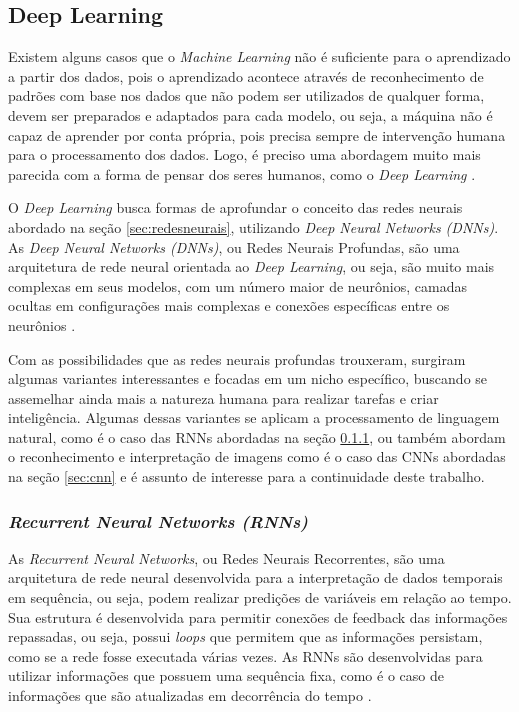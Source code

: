 \subsection{Deep Learning}
Existem alguns casos que o \emph{Machine Learning} não é suficiente para o aprendizado a partir dos dados, pois o aprendizado acontece através de reconhecimento de padrões com base nos dados que não podem ser utilizados de qualquer forma, devem ser preparados e adaptados para cada modelo, ou seja, a máquina não é capaz de aprender por conta própria, pois precisa sempre de intervenção humana para o processamento dos dados. Logo, é preciso uma abordagem muito mais parecida com a forma de pensar dos seres humanos, como o \emph{Deep Learning} \cite{deepLearningPython, deepLearningTensorFlow}.

O \emph{Deep Learning} busca formas de aprofundar o conceito das redes neurais abordado na seção \ref{sec:redesneurais}, utilizando \emph{Deep Neural Networks (DNNs)}. As \emph{Deep Neural Networks (DNNs)}, ou Redes Neurais Profundas, são uma arquitetura de rede neural orientada ao \emph{Deep Learning}, ou seja, são muito mais complexas em seus modelos, com um número maior de neurônios, camadas ocultas em configurações mais complexas e conexões específicas entre os neurônios \cite{deepLearningTensorFlow}.

Com as possibilidades que as redes neurais profundas trouxeram, surgiram algumas variantes interessantes e focadas em um nicho específico, buscando se assemelhar ainda mais a natureza humana para realizar tarefas e criar inteligência. Algumas dessas variantes se aplicam a processamento de linguagem natural, como é o caso das RNNs abordadas na seção \ref{sec:rnn}, ou também abordam o reconhecimento e interpretação de imagens como é o caso das CNNs abordadas na seção \ref{sec:cnn} e é assunto de interesse para a continuidade deste trabalho.

\subsubsection{\emph{Recurrent Neural Networks (RNNs)}}
\label{sec:rnn}
As \emph{Recurrent Neural Networks}, ou Redes Neurais Recorrentes, são uma arquitetura de rede neural desenvolvida para a interpretação de dados temporais em sequência, ou seja, podem realizar predições de variáveis em relação ao tempo. Sua estrutura é desenvolvida para permitir conexões de feedback das informações repassadas, ou seja, possui \emph{loops} que permitem que as informações persistam, como se a rede fosse executada várias vezes. As RNNs são desenvolvidas para utilizar informações que possuem uma sequência fixa, como é o caso de informações que são atualizadas em decorrência do tempo \cite{deepLearningTensorFlow}.

